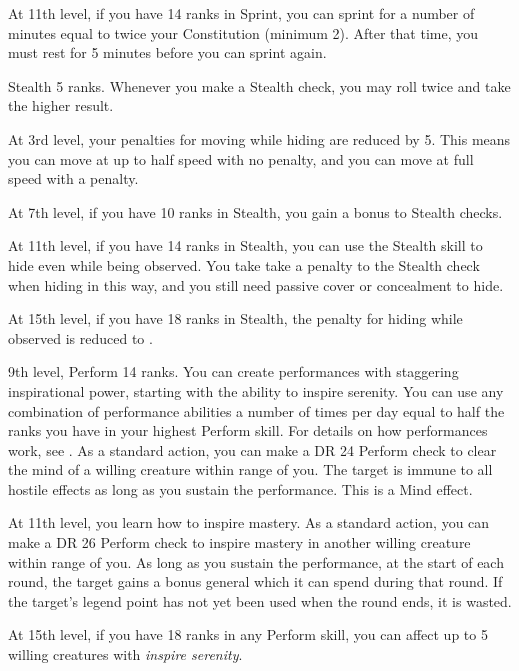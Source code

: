     At 11th level, if you have 14 ranks in Sprint, you can sprint for a number of minutes equal to twice your Constitution (minimum 2).
    After that time, you must rest for 5 minutes before you can sprint again.

    \featpre Stealth 5 ranks.
    \featben Whenever you make a Stealth check, you may roll twice and take the higher result.

    At 3rd level, your penalties for moving while hiding are reduced by 5.
    This means you can move at up to half speed with no penalty, and you can move at full speed with a  penalty.

    At 7th level, if you have 10 ranks in Stealth, you gain a  bonus to Stealth checks.

    At 11th level, if you have 14 ranks in Stealth, you can use the Stealth skill to hide even while being observed.
    You take take a  penalty to the Stealth check when hiding in this way, and you still need passive cover or concealment to hide.

    At 15th level, if you have 18 ranks in Stealth, the penalty for hiding while observed is reduced to .

    \featpres 9th level, Perform 14 ranks.
    \featben You can create performances with staggering inspirational power, starting with the ability to inspire serenity.
    You can use any combination of performance abilities a number of times per day equal to half the ranks you have in your highest Perform skill.
    For details on how performances work, see .
     As a standard action, you can make a DR 24 Perform check to clear the mind of a willing creature within \rngmed range of you.
    The target is immune to all hostile  effects as long as you sustain the performance.
    This is a Mind effect.

    At 11th level, you learn how to inspire mastery.
     As a standard action, you can make a DR 26 Perform check to inspire mastery in another willing creature within \rngmed range of you.
    As long as you sustain the performance, at the start of each round, the target gains a bonus general  which it can spend during that round.
    If the target's legend point has not yet been used when the round ends, it is wasted.

    At 15th level, if you have 18 ranks in any Perform skill, you can affect up to 5 willing creatures with \textit{inspire serenity}.

